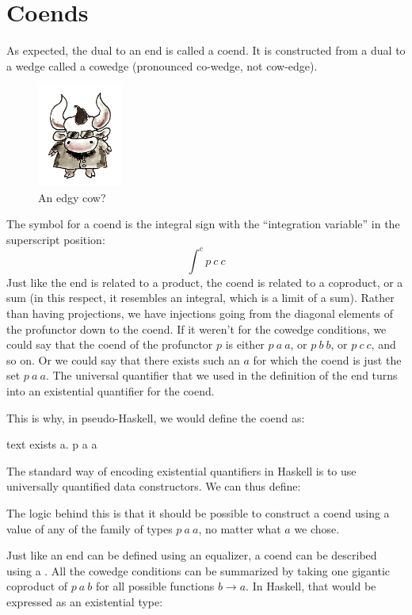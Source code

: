 \section{Coends}
As expected, the dual to an end is called a coend. It is constructed
from a dual to a wedge called a cowedge (pronounced co-wedge, not
cow-edge).

\begin{figure}[H]
\centering
\includegraphics[width=0.25\textwidth]{images/end-31.jpg}
\caption{An edgy cow?}
\end{figure}

\noindent
The symbol for a coend is the integral sign with the ``integration
variable'' in the superscript position:
\[\int^c p\ c\ c\]
Just like the end is related to a product, the coend is related to a
coproduct, or a sum (in this respect, it resembles an integral, which is
a limit of a sum). Rather than having projections, we have injections
going from the diagonal elements of the profunctor down to the coend. If
it weren't for the cowedge conditions, we could say that the coend of
the profunctor $p$ is either $p\ a\ a$, or
$p\ b\ b$, or $p\ c\ c$, and so on. Or we could say that
there exists such an $a$ for which the coend is just the set
$p\ a\ a$. The universal quantifier that we used in the
definition of the end turns into an existential quantifier for the
coend.

This is why, in pseudo-Haskell, we would define the coend as:

\begin{snip}{text}
exists a. p a a
\end{snip}
The standard way of encoding existential quantifiers in Haskell is to
use universally quantified data constructors. We can thus define:

The logic behind this is that it should be possible to construct a coend
using a value of any of the family of types $p\ a\ a$, no matter
what $a$ we chose.

Just like an end can be defined using an equalizer, a coend can be
described using a . All the cowedge conditions can be
summarized by taking one gigantic coproduct of $p\ a\ b$ for all
possible functions $b \to a$. In Haskell, that would be
expressed as an existential type:

